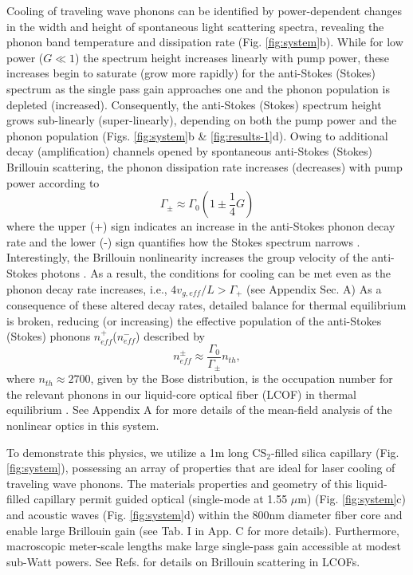 Cooling of traveling wave phonons can be identified by power-dependent changes in the width and height of spontaneous light scattering spectra, revealing the phonon band temperature and dissipation rate (Fig. \ref{fig:system}b). While for low power ($G \ll 1$) the spectrum height increases linearly with pump power, these increases begin to saturate (grow more rapidly) for the anti-Stokes (Stokes) spectrum as the single pass gain approaches one and the phonon population is depleted (increased). Consequently, the anti-Stokes (Stokes) spectrum height grows sub-linearly (super-linearly), depending on both the pump power and the phonon population (Figs. \ref{fig:system}b \& \ref{fig:results-1}d). Owing to additional decay (amplification) channels opened by spontaneous anti-Stokes (Stokes) Brillouin scattering, the phonon dissipation rate increases (decreases) with pump power according to
\begin{equation}
\label{eq:gamma}
   \Gamma_{\pm} \approx \Gamma_0\left(1\pm \frac{1}{4}G\right)
\end{equation}
where the upper (+) sign indicates an increase in the anti-Stokes phonon decay rate and the lower (-) sign quantifies how the Stokes spectrum narrows \cite{otterstrom2018optomechanical}.
%
Interestingly, the Brillouin nonlinearity increases the group velocity of the anti-Stokes photons  \cite{gonzalez2005optically}. As a result, the conditions for cooling can be met even as the phonon decay rate increases, i.e., $4 v_{g,eff}/L > \Gamma_+$ (see Appendix Sec. A)
%
As a consequence of these altered decay rates, detailed balance for thermal equilibrium is broken, reducing (or increasing) the effective population of the anti-Stokes (Stokes) phonons $n^+_{eff}$($n^-_{eff}$) described by
\begin{equation}
\label{eq:neff}
    n^{\pm}_{eff} \approx \frac{\Gamma_0}{\Gamma_{\pm}} n_{th},
\end{equation}
where $n_{th} \approx 2700$, given by the Bose distribution, is the occupation number for the relevant phonons in our liquid-core optical fiber (LCOF) in thermal equilibrium \cite{otterstrom2018optomechanical}. See Appendix A for more details of the mean-field analysis of the nonlinear optics in this system.

To demonstrate this physics, we utilize a 1m long CS$_2$-filled silica capillary (Fig. \ref{fig:system}), possessing an array of properties that are ideal for laser cooling of traveling wave phonons. The materials properties and geometry of this liquid-filled capillary permit guided optical (single-mode at 1.55 $\mu$m) (Fig. \ref{fig:system}c) and acoustic waves (Fig. \ref{fig:system}d) within the $800$nm diameter fiber core and enable large Brillouin gain (see Tab. I in App. C for more details). Furthermore, macroscopic meter-scale lengths make large single-pass gain accessible at modest sub-Watt powers. See Refs. \cite{kieu2013brillouin,kieu2014nonlinear,behunin2019spontaneous} for details on Brillouin scattering in LCOFs.

